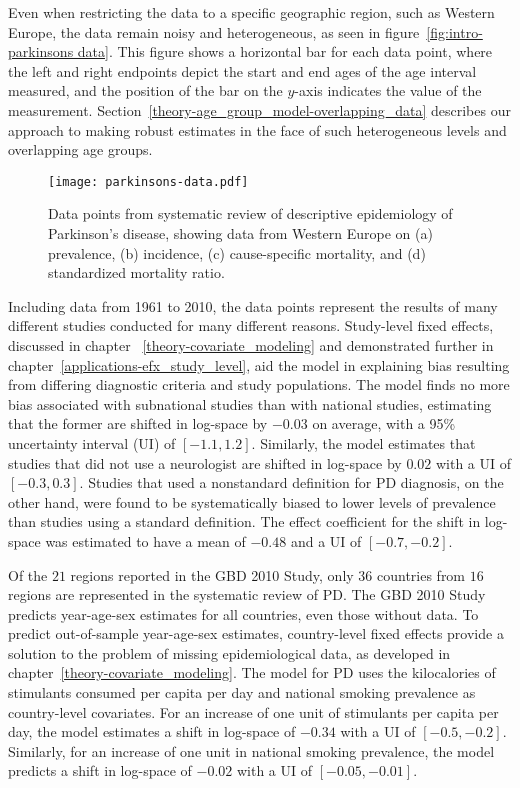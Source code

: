 Even when restricting the data to a
specific geographic region, such as Western Europe, the data remain
noisy and heterogeneous, as seen in figure~\ref{fig:intro-parkinsons
  data}. This figure shows a horizontal bar for each data point, where
the left and right endpoints depict the start and end ages of the age
interval measured, and the position of the bar on the $y$-axis indicates the value of the
measurement. Section~\ref{theory-age_group_model-overlapping_data}
describes our approach to making
robust estimates in the face of such heterogeneous levels and
overlapping age groups.

    \begin{figure}[h]
        \begin{center}
            \texttt{[image: parkinsons-data.pdf]}
            \caption{Data points from systematic review of descriptive
              epidemiology of Parkinson's disease, showing data from
              Western Europe on (a) prevalence, (b) incidence, (c)
              cause-specific mortality, and (d) standardized mortality
              ratio.}
            \label{fig:intro-parkinsons data}
        \end{center}
    \end{figure}

Including data from 1961 to 2010, the data points represent the results
of many different studies conducted for many different reasons.
Study-level fixed effects, discussed in chapter
~\ref{theory-covariate_modeling} and demonstrated further in
chapter~\ref{applications-efx_study_level}, aid the model in
explaining bias resulting from differing diagnostic criteria and study
populations.  The model finds no more bias associated with subnational
studies than with national studies, estimating that the former are
shifted in log-space by $-0.03$ on average, with a 95\% uncertainty
interval (UI) of $[-1.1, 1.2]$.  Similarly, the model estimates that studies that did not use a
neurologist are shifted in log-space by $0.02$ with a
UI of $[-0.3, 0.3]$.  Studies that used a nonstandard definition for PD
diagnosis, on the other hand, were found to be systematically biased
to lower levels of prevalence than studies using a standard definition. The
effect coefficient for the shift in log-space was estimated to have a
mean of $-0.48$ and a UI of $[-0.7, -0.2]$.

Of the $21$ regions reported in the GBD 2010 Study, only $36$ countries
from $16$ regions are represented in the systematic review of PD.  The GBD
2010 Study predicts year-age-sex estimates for all countries, even
those without data.  To predict out-of-sample year-age-sex estimates, country-level fixed
effects provide a solution to the problem of missing epidemiological data,
as developed in chapter~\ref{theory-covariate_modeling}.  The model for PD uses the
kilocalories of stimulants consumed per capita per day and national smoking prevalence
as country-level covariates.  For an increase of one unit of stimulants per
capita per day, the model estimates a shift in log-space of $-0.34$
with a UI of $[-0.5, -0.2]$.  Similarly, for an increase of one unit in national
smoking prevalence, the model predicts a shift in log-space of $-0.02$ with a UI
of $[-0.05, -0.01]$.

